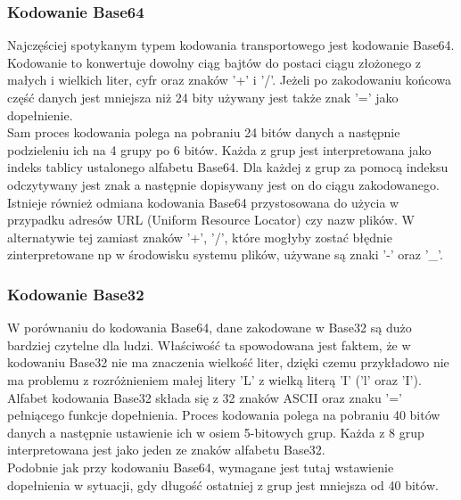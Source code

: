 \subsubsection{Kodowanie Base64}
Najczęściej spotykanym typem kodowania transportowego jest kodowanie Base64. Kodowanie to konwertuje dowolny ciąg bajtów do postaci ciągu złożonego z małych i wielkich liter, cyfr oraz znaków '+' i '/'. 
Jeżeli po zakodowaniu końcowa część danych jest mniejsza niż 24 bity używany jest także znak '=' jako dopełnienie. \\
Sam proces kodowania polega na pobraniu 24 bitów danych a następnie podzieleniu ich na 4 grupy po 6 bitów. Każda z grup jest interpretowana jako indeks tablicy ustalonego alfabetu Base64.
Dla każdej z grup za pomocą indeksu odczytywany jest znak a następnie dopisywany jest on do ciągu zakodowanego. \\
Istnieje również odmiana kodowania Base64 przystosowana do użycia w przypadku adresów URL (Uniform Resource Locator) czy nazw plików.
W alternatywie tej zamiast znaków '+', '/', które mogłyby zostać błędnie zinterpretowane np w środowisku systemu plików,
używane są znaki '-' oraz '\_'.

\subsubsection{Kodowanie Base32}
W porównaniu do kodowania Base64, dane zakodowane w Base32 są dużo bardziej czytelne dla ludzi.
Właściwość ta spowodowana jest faktem, że w kodowaniu Base32 nie ma znaczenia wielkość liter, dzięki czemu przykładowo
nie ma problemu z rozróżnieniem małej litery 'L' z wielką literą 'I' ('l' oraz 'I'). \\
Alfabet kodowania Base32 składa się z 32 znaków ASCII oraz znaku '=' pełniącego funkcje dopełnienia.
Proces kodowania polega na pobraniu 40 bitów danych a następnie ustawienie ich w osiem 5-bitowych grup. 
Każda z 8 grup interpretowana jest jako jeden ze znaków alfabetu Base32. \\
Podobnie jak przy kodowaniu Base64, wymagane jest tutaj wstawienie dopełnienia w sytuacji, gdy długość ostatniej z grup jest mniejsza od 40 bitów.

